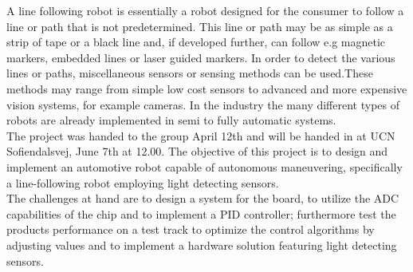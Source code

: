 A line following robot is essentially a robot designed for the consumer to follow a line or path that is not predetermined. This line or path may be as simple as a strip of tape or a black line and, if  developed further, can follow e.g magnetic markers, embedded lines or laser guided markers. In order to detect the various lines or paths, miscellaneous sensors or sensing methods can be used.\newline These methods may range from simple low cost sensors to advanced and more expensive vision systems, for example cameras. In the industry the many different types of robots are already implemented in semi to fully automatic systems.\\

The project was handed to the group April 12th and will be handed in at UCN Sofiendalsvej, June 7th at 12.00.\newline
The objective of this project is to design and implement an automotive robot capable of autonomous maneuvering, specifically a line-following robot employing light detecting sensors.  \\
The challenges at hand are to design a system for the board, to utilize the ADC capabilities of the chip and to implement a PID controller; furthermore test the products performance on a test track to optimize the control algorithms by adjusting values and to implement a hardware solution featuring light detecting sensors.